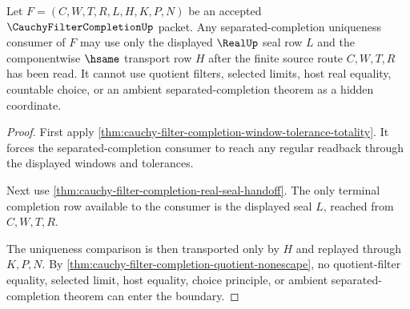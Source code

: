 \begin{theorem}
\label{thm:cauchy-filter-completion-separated-completion-boundary}
Let $F=(C,W,T,R,L,H,K,P,N)$ be an accepted $\CauchyFilterCompletionUp$ packet. Any separated-completion uniqueness consumer of $F$ may use only the displayed $\RealUp$ seal row $L$ and the componentwise $\hsame$ transport row $H$ after the finite source route $C,W,T,R$ has been read. It cannot use quotient filters, selected limits, host real equality, countable choice, or an ambient separated-completion theorem as a hidden coordinate.
\end{theorem}
\begin{proof}
First apply \autoref{thm:cauchy-filter-completion-window-tolerance-totality}. It forces the separated-completion consumer to reach any regular readback through the displayed windows and tolerances.

Next use \autoref{thm:cauchy-filter-completion-real-seal-handoff}. The only terminal completion row available to the consumer is the displayed seal $L$, reached from $C,W,T,R$.

The uniqueness comparison is then transported only by $H$ and replayed through $K,P,N$. By \autoref{thm:cauchy-filter-completion-quotient-nonescape}, no quotient-filter equality, selected limit, host equality, choice principle, or ambient separated-completion theorem can enter the boundary.
\end{proof}

